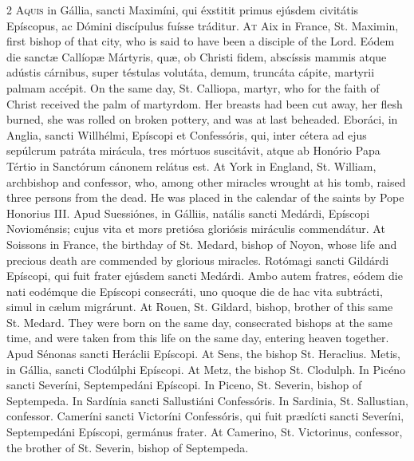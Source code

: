 \begin{paracol}{2}
\lettrine[lines=2]{A}{quis} in Gállia, sancti 
 Maximíni, qui éxstitit primus ejúsdem civitátis Epíscopus, ac Dómini 
 discípulus fuísse tráditur.
\switchcolumn
{}
\lettrine[lines=2]{A}{t} Aix in France, St. Maximin, first 
 bishop of that city, who is said to have been a disciple of the Lord.
\switchcolumn*
{}
Eódem die sanctæ 
 Callíopæ Mártyris, quæ, ob Christi fidem, abscíssis mammis atque adústis 
 cárnibus, super téstulas volutáta, demum, truncáta cápite, martyrii palmam 
 accépit.
\switchcolumn
{}
On the same day, St. Calliopa, 
 martyr, who for the faith of Christ received the palm of martyrdom. 
 Her breasts had been cut away, her flesh burned, she was rolled on broken 
 pottery, and was at last beheaded.
\switchcolumn*
{}
Eboráci, in Anglia, 
 sancti Willhélmi, Epíscopi et Confessóris, qui, inter cétera ad ejus 
 sepúlcrum patráta mirácula, tres mórtuos suscitávit, atque ab Honório Papa 
 Tértio in Sanctórum cánonem relátus est.
\switchcolumn
{}
At York in England, St. William, 
 archbishop and confessor, who, among other miracles wrought at his tomb, 
 raised three persons from the dead. He was placed in the calendar of 
 the saints by Pope Honorius III.
\switchcolumn*
{}
Apud Suessiónes, in 
 Gálliis, natális sancti Medárdi, Epíscopi Novioménsis; cujus vita et mors 
 pretiósa gloriósis miráculis commendátur.
\switchcolumn
{}
At Soissons in France, the birthday 
 of St. Medard, bishop of Noyon, whose life and precious death are commended 
 by glorious miracles.
\switchcolumn*
{}
Rotómagi sancti 
 Gildárdi Epíscopi, qui fuit frater ejúsdem sancti Medárdi. Ambo autem 
 fratres, eódem die nati eodémque die Epíscopi consecráti, uno quoque die de 
 hac vita subtrácti, simul in cælum migrárunt.
\switchcolumn
{}
At Rouen, St. Gildard, bishop, 
 brother of this same St. Medard. They were born on the same day, 
 consecrated bishops at the same time, and were taken from this life on the 
 same day, entering heaven together.
\switchcolumn*
{}
Apud Sénonas sancti 
 Heráclii Epíscopi.
\switchcolumn
{}
At Sens, the bishop St. Heraclius.
\switchcolumn*
{}
Metis, in Gállia, 
 sancti Clodúlphi Epíscopi.
\switchcolumn
{}
At Metz, the bishop St. Clodulph.
\switchcolumn*
{}
In Picéno sancti 
 Severíni, Septempedáni Epíscopi.
\switchcolumn
{}
In Piceno, St. Severin, bishop of 
 Septempeda.
\switchcolumn*
{}
In Sardínia sancti 
 Sallustiáni Confessóris.
\switchcolumn
{}
In Sardinia, St. Sallustian, 
 confessor.
\switchcolumn*
{}
Cameríni sancti 
 Victoríni Confessóris, qui fuit prædícti sancti Severíni, Septempedáni 
 Epíscopi, germánus frater.
\switchcolumn
{}
At Camerino, St. Victorinus, 
 confessor, the brother of St. Severin, bishop of Septempeda.
\switchcolumn*
{}
\end{paracol}


